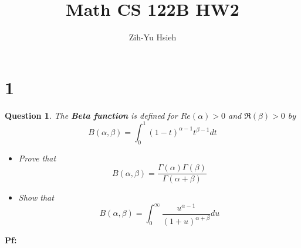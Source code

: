 \documentclass{article}
\title{Math CS 122B HW2}
\author{Zih-Yu Hsieh}
\newtheorem{question}{Question}
\begin{document}
\maketitle

\section*{1}
\begin{myBox}[]{}
    \begin{question}
        The \textbf{Beta function} is defined for $Re(\alpha)>0$ and $\Re(\beta)>0$ by
        $$B(\alpha,\beta)=\int_{0}^{1}(1-t)^{\alpha-1}t^{\beta-1}dt$$
        \begin{itemize}
            \item[(a)] Prove that 
            $$B(\alpha,\beta)=\frac{\Gamma(\alpha)\Gamma(\beta)}{\Gamma(\alpha+\beta)}$$
            \item[(b)] Show that
            $$B(\alpha,\beta)=\int_{0}^{\infty}\frac{u^{\alpha-1}}{(1+u)^{\alpha+\beta}}du$$
        \end{itemize}
    \end{question}
\end{myBox}

\textbf{Pf:}
\end{document}
